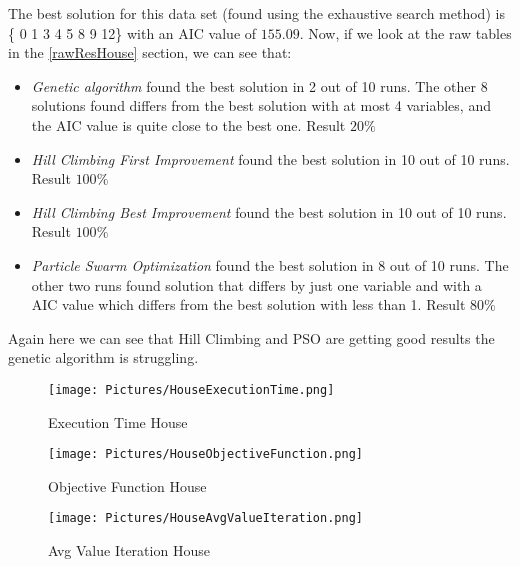  The best solution for this data set (found using the exhaustive search method) is
 \{ 0 1 3 4 5 8 9 12\} with an AIC value of $155.09$. Now, if we look at the raw tables in the \ref{rawResHouse} section, we can see that:
 \begin{itemize}
 	\item \textit{Genetic algorithm} found the best solution in 2 out of 10 runs. The other 8 solutions found differs from the best solution with at most 4 variables, and the AIC value is quite close to the best one. Result $20 \%$
 	\item \textit{Hill Climbing First Improvement} found the best solution in 10 out of 10 runs. Result $100 \%$
	\item \textit{Hill Climbing Best Improvement} found the best solution in 10 out of 10 runs. Result $100 \%$
 	\item \textit{Particle Swarm Optimization} found the best solution in 8 out of 10 runs. The other two runs found solution that differs by just one variable and with a AIC value which differs from the best solution with less than 1. Result $80 \%$
 \end{itemize}

Again here we can see that Hill Climbing and PSO are getting good results the genetic algorithm is struggling.


\begin{figure}
	\texttt{[image: Pictures/HouseExecutionTime.png]}
	\caption{ Execution Time House}
	\label{Execution Time House}
\end{figure}

\begin{figure}
	\texttt{[image: Pictures/HouseObjectiveFunction.png]}
	\caption{ Objective Function House }
	\label{Objective Function House}
\end{figure}

\begin{figure}
	\texttt{[image: Pictures/HouseAvgValueIteration.png]}
	\caption{ Avg Value Iteration House }
	\label{Avg Value Iteration House}
\end{figure}

